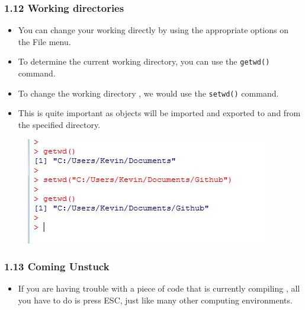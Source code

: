 \documentclass{beamer}
\begin{document}
 	
 	
 	
 	\begin{frame}
 		\frametitle{1.12 Working directories}
 		\large
 		\begin{itemize}
 			\item You can change your working directly by using the appropriate options on the File menu. 
 			\item To
 			determine the current working directory, you can use the \texttt{getwd()} command. 
 			\item To change the
 			working directory , we would use the \texttt{setwd()} command.
 			\item  This is quite important as objects
 			will be imported and exported to and from the specified directory.
 		\end{itemize}
 	\end{frame}
 	\begin{frame}
 		\begin{figure}
 			\centering
 			\includegraphics[width=1.2\linewidth]{images/workingdir}
 			
 		\end{figure}
 		
 	\end{frame}
 	\begin{frame}
 		\frametitle{1.13 Coming Unstuck}
 		\Large
 		\begin{itemize}
 			\item  If you are having trouble with a piece of code that is currently compiling , all you have to do is press ESC, just like many other computing environments.
 		\end{itemize}  
 	\end{frame}
\end{document}
